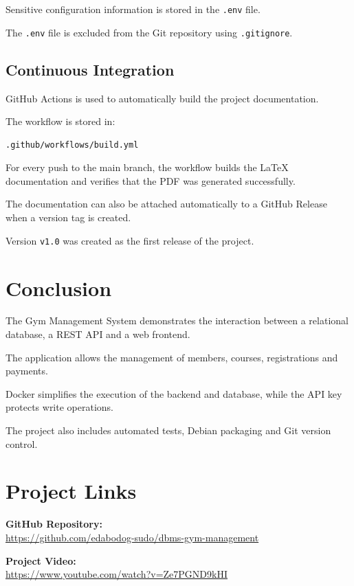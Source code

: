 \documentclass[12pt,a4paper]{article}
\begin{document}
Sensitive configuration information is stored in the
\texttt{.env} file.

The \texttt{.env} file is excluded from the Git repository
using \texttt{.gitignore}.


\subsection{Continuous Integration}

GitHub Actions is used to automatically build the project
documentation.

The workflow is stored in:

\begin{lstlisting}
.github/workflows/build.yml
\end{lstlisting}

For every push to the main branch, the workflow builds the
LaTeX documentation and verifies that the PDF was generated
successfully.

The documentation can also be attached automatically to a
GitHub Release when a version tag is created.

Version \texttt{v1.0} was created as the first release of the
project.



\section{Conclusion}

The Gym Management System demonstrates the interaction between
a relational database, a REST API and a web frontend.

The application allows the management of members, courses,
registrations and payments.

Docker simplifies the execution of the backend and database,
while the API key protects write operations.

The project also includes automated tests, Debian packaging and
Git version control.

\section{Project Links}

\textbf{GitHub Repository:}\\
\url{https://github.com/edabodog-sudo/dbms-gym-management}

\vspace{0.3cm}

\textbf{Project Video:}\\
\url{https://www.youtube.com/watch?v=Ze7PGND9kHI}
\end{document}

